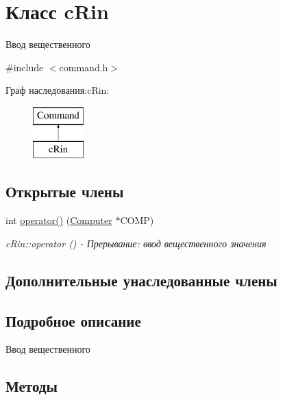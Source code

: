 \hypertarget{classc_rin}{}\section{Класс c\+Rin}
\label{classc_rin}


Ввод вещественного  




{\ttfamily \#include $<$command.\+h$>$}

Граф наследования\+:c\+Rin\+:\begin{figure}[H]
\begin{center}
\leavevmode
\includegraphics[height=2.000000cm]{classc_rin}
\end{center}
\end{figure}
\subsection*{Открытые члены}
\begin{DoxyCompactItemize}
\item 
int \hyperlink{classc_rin_a28177e2dd8dcc938881ff6629ecd5685}{operator()} (\hyperlink{class_computer}{Computer} $\ast$C\+O\+MP)
\begin{DoxyCompactList}\small\item\em c\+Rin\+::operator () -\/ Прерывание\+: ввод вещественного значения \end{DoxyCompactList}\end{DoxyCompactItemize}
\subsection*{Дополнительные унаследованные члены}


\subsection{Подробное описание}
Ввод вещественного 

\subsection{Методы}
\hypertarget{classc_rin_a28177e2dd8dcc938881ff6629ecd5685}{}\label{classc_rin_a28177e2dd8dcc938881ff6629ecd5685} 
